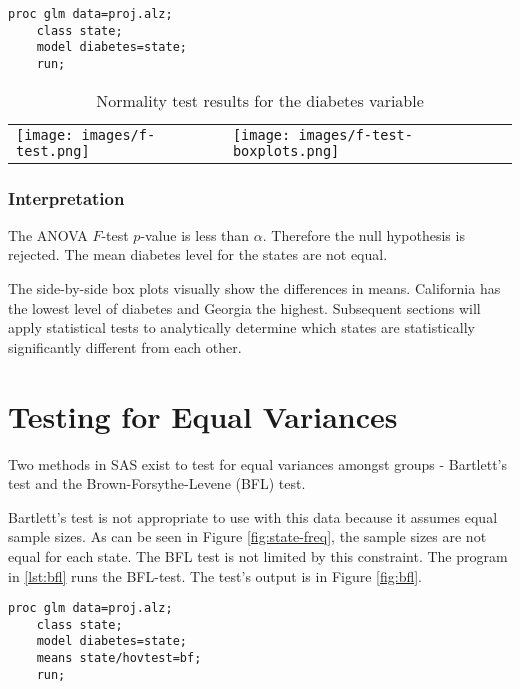 \documentclass{article}
\begin{document}
\begin{lstlisting}[language=SAS,caption=ANOVA F-test SAS progam,captionpos=b,label=lst:anova]
    proc glm data=proj.alz;
    class state;
    model diabetes=state;
    run;
\end{lstlisting}

\begin{table}[ht]
    \begin{tabular}{ll}
         \texttt{[image: images/f-test.png]} & \texttt{[image: images/f-test-boxplots.png]} \\
    \end{tabular}
    \caption{Normality test results for the diabetes variable}
    \label{tab:anova}
\end{table}

\subsubsection{Interpretation}
The ANOVA $F$-test $p$-value is less than $\alpha$. Therefore the null hypothesis is rejected. The mean diabetes level for the states are not equal. 

The side-by-side box plots visually show the differences in means. California has the lowest level of diabetes and Georgia the highest. Subsequent sections will apply statistical tests to analytically determine which states are statistically significantly different from each other.

\section{Testing for Equal Variances}
Two methods in SAS exist to test for equal variances amongst groups - Bartlett's test and the Brown-Forsythe-Levene (BFL) test.

Bartlett's test is not appropriate to use with this data because it assumes equal sample sizes. As can be seen in Figure \ref{fig:state-freq}, the sample sizes are not equal for each state. The BFL test is not limited by this constraint. The program in \ref{lst:bfl} runs the BFL-test. The test's output is in Figure \ref{fig:bfl}. 

\begin{lstlisting}[language=SAS,caption=BFL test SAS progam,captionpos=b,label=lst:bfl]
    proc glm data=proj.alz;
    class state;
    model diabetes=state;
    means state/hovtest=bf;
    run;
\end{lstlisting}
\end{document}
